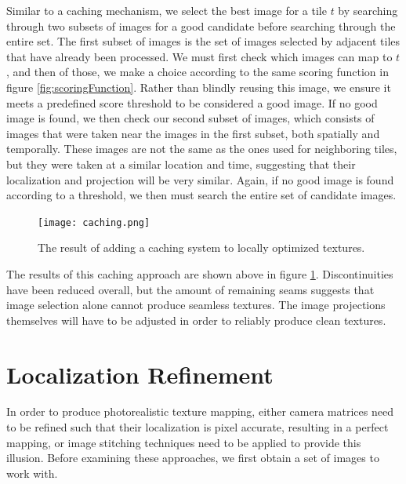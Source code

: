 \documentclass[10pt,twocolumn,letterpaper]{article}
\begin{document}
Similar to a caching mechanism, we select the best image for a tile
$t$ by searching through two subsets of images for a good candidate
before searching through the entire set. The first subset of images is
the set of images selected by adjacent tiles that have already been
processed. We must first check which images can map to $t$, and then
of those, we make a choice according to the same scoring function in
figure \ref{fig:scoringFunction}. Rather than blindly reusing this
image, we ensure it meets a predefined score threshold to be
considered a good image. If no good image is found, we then check our
second subset of images, which consists of images that were taken near
the images in the first subset, both spatially and temporally. These
images are not the same as the ones used for neighboring tiles, but
they were taken at a similar location and time, suggesting that their
localization and projection will be very similar. Again, if no good
image is found according to a threshold, we then must search the
entire set of candidate images.

\begin{figure}
  \centering
  \texttt{[image: caching.png]}
  \caption{The result of adding a caching system to locally optimized textures.}
  \label{fig:caching}
\end{figure}


The results of this caching approach are shown above in figure
\ref{fig:caching}.  Discontinuities have been reduced overall, but the
amount of remaining seams suggests that image selection
alone cannot produce seamless textures. The image projections themselves will have to be adjusted in order to reliably produce clean textures.


\section{Localization Refinement}
In order to produce photorealistic texture mapping, either camera
matrices need to be refined such that their localization is pixel
accurate, resulting in a perfect mapping, or image stitching
techniques need to be applied to provide this illusion. Before
examining these approaches, we first obtain a set of images to work
with.
\end{document}

